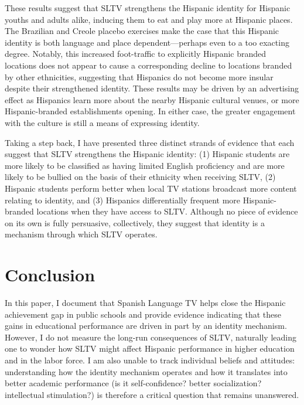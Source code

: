 \documentclass[11pt]{article}
\begin{document}
These results suggest that SLTV strengthens the Hispanic identity for Hispanic youths and adults alike, inducing them to eat and play more at Hispanic places. The Brazilian and Creole placebo exercises make the case that this Hispanic identity is both language and place dependent---perhaps even to a too exacting degree. Notably, this increased foot-traffic to explicitly Hispanic branded locations does not appear to cause a corresponding decline to locations branded by other ethnicities, suggesting that Hispanics do not become more insular despite their strengthened identity. These results may be driven by an advertising effect as Hispanics learn more about the nearby Hispanic cultural venues, or more Hispanic-branded establishments opening. In either case, the greater engagement with the culture is still a means of expressing identity. 

Taking a step back, I have presented three distinct strands of evidence that each suggest that SLTV strengthens the Hispanic identity: (1) Hispanic students are more likely to be classified as having limited English proficiency and are more likely to be bullied on the basis of their ethnicity when receiving SLTV, (2) Hispanic students perform better when local TV stations broadcast more content relating to identity, and (3) Hispanics differentially frequent more Hispanic-branded locations when they have access to SLTV. Although no piece of evidence on its own is fully persuasive, collectively, they suggest that identity is a mechanism through which SLTV operates.



\section{Conclusion} \label{s:conclusion}

In this paper, I document that Spanish Language TV helps close the Hispanic achievement gap in public schools and provide evidence indicating that these gains in educational performance are driven in part by an identity mechanism. However, I do not measure the long-run consequences of SLTV, naturally leading one to wonder how SLTV might affect Hispanic performance in higher education and in the labor force. I am also unable to track individual beliefs and attitudes: understanding how the identity mechanism operates and how it translates into better academic performance (is it self-confidence? better socialization? intellectual stimulation?) is therefore a critical question that remains unanswered.
\end{document}
